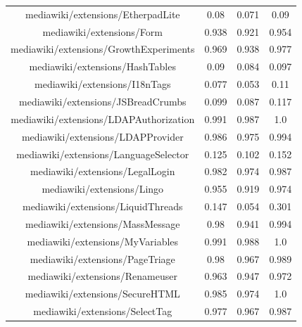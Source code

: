 \begin{table}[H]
\begin{tabular}{@{}c c c c@{}}
mediawiki/extensions/EtherpadLite & 0.08 & 0.071 & 0.09 \\
mediawiki/extensions/Form & 0.938 & 0.921 & 0.954 \\
mediawiki/extensions/GrowthExperiments & 0.969 & 0.938 & 0.977 \\
mediawiki/extensions/HashTables & 0.09 & 0.084 & 0.097 \\
mediawiki/extensions/I18nTags & 0.077 & 0.053 & 0.11 \\
mediawiki/extensions/JSBreadCrumbs & 0.099 & 0.087 & 0.117 \\
mediawiki/extensions/LDAPAuthorization & 0.991 & 0.987 & 1.0 \\
mediawiki/extensions/LDAPProvider & 0.986 & 0.975 & 0.994 \\
mediawiki/extensions/LanguageSelector & 0.125 & 0.102 & 0.152 \\
mediawiki/extensions/LegalLogin & 0.982 & 0.974 & 0.987 \\
mediawiki/extensions/Lingo & 0.955 & 0.919 & 0.974 \\
mediawiki/extensions/LiquidThreads & 0.147 & 0.054 & 0.301 \\
mediawiki/extensions/MassMessage & 0.98 & 0.941 & 0.994 \\
mediawiki/extensions/MyVariables & 0.991 & 0.988 & 1.0 \\
mediawiki/extensions/PageTriage & 0.98 & 0.967 & 0.989 \\
mediawiki/extensions/Renameuser & 0.963 & 0.947 & 0.972 \\
mediawiki/extensions/SecureHTML & 0.985 & 0.974 & 1.0 \\
mediawiki/extensions/SelectTag & 0.977 & 0.967 & 0.987 \\
    \hline
\end{tabular}
    \label{table:accuracy-score-merged-voted-appendix-c-part-1}
\end{table}


